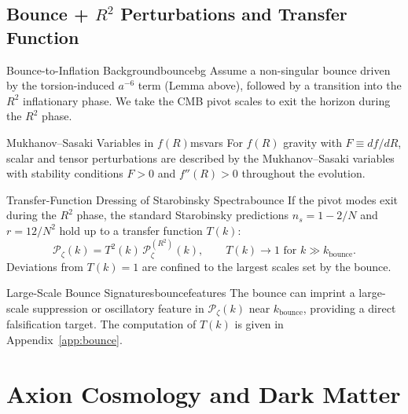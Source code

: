 \subsection{\texorpdfstring{Bounce + $R^2$ Perturbations and Transfer Function}{Bounce + R2 Perturbations and Transfer Function}}
\label{sec:bounce}

\begin{definition}{Bounce-to-Inflation Background}{bouncebg}
Assume a non-singular bounce driven by the torsion-induced $a^{-6}$ term
(Lemma above), followed by a transition into the $R^2$ inflationary phase.
We take the CMB pivot scales to exit the horizon during the $R^2$ phase.
\end{definition}

\begin{definition}{Mukhanov--Sasaki Variables in $f(R)$}{msvars}
For $f(R)$ gravity with $F \equiv df/dR$, scalar and tensor perturbations are
described by the Mukhanov--Sasaki variables with stability conditions
$F>0$ and $f''(R)>0$ throughout the evolution.
\end{definition}

\begin{theorem}{Transfer-Function Dressing of Starobinsky Spectra}{bounce}
If the pivot modes exit during the $R^2$ phase, the standard Starobinsky
predictions
$n_s = 1 - 2/N$ and $r = 12/N^2$ hold up to a transfer function $T(k)$:
\begin{equation}
    \mathcal{P}_\zeta(k) = T^2(k)\,\mathcal{P}_\zeta^{(R^2)}(k),
    \qquad T(k)\to 1 \text{ for } k \gg k_{\text{bounce}}.
\end{equation}
Deviations from $T(k)=1$ are confined to the largest scales set by the bounce.
\end{theorem}

\begin{corollary}{Large-Scale Bounce Signatures}{bouncefeatures}
The bounce can imprint a large-scale suppression or oscillatory feature in
$\mathcal{P}_\zeta(k)$ near $k_{\text{bounce}}$, providing a direct falsification
target. The computation of $T(k)$ is given in Appendix~\ref{app:bounce}.
\end{corollary}

\TFPTTransferFunctionPlot



\section{Axion Cosmology and Dark Matter}

